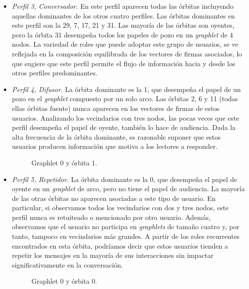 \begin{itemize}
\item \emph{Perfil 3, Conversador.} En este perfil aparecen todas las órbitas incluyendo aquellas dominantes de los otros cuatro perfiles. Las órbitas dominantes en este perfil son la 29, 7, 17, 21 y 31. Las mayoría de las órbitas son oyentes, pero la órbita 31 desempeña todos los papeles de pozo en un \textit{graphlet} de 4 nodos. La variedad de roles que puede adoptar este grupo de usuarios, se ve reflejada en la composición equilibrada de los vectores de firmas asociados, lo que sugiere que este perfil permite el flujo de información hacia y desde los otros perfiles predominantes.

\item \emph{Perfil 4, Difusor.} La órbita dominante es la 1, que desempeña el papel de un pozo en el \textit{graphlet} compuesto por un solo arco. Las órbitas 2, 6 y 11 (todas ellas órbitas fuente) nunca aparecen en los vectores de firmas de estos usuarios. Analizando los vecindarios con tres nodos, las pocas veces que este perfil desempeña el papel de oyente, también lo hace de audiencia. Dada la alta frecuencia de la órbita dominante, es razonable suponer que estos usuarios producen información que motiva a los lectores a responder. 
\begin{figure}[htbp]
   \centering
   
    \caption{Graphlet 0 y órbita 1.}
    \label{fig:0-1}
\end{figure}

\item \emph{Perfil 5, Repetidor.} La órbita dominante es la 0, que desempeña el papel de oyente en un \textit{graphlet} de arco, pero no tiene el papel de audiencia. La mayoría de las otras órbitas no aparecen asociadas a este tipo de usuario. En particular, si observamos todos los vecindarios con dos y tres nodos, este perfil nunca es retuiteado o mencionado por otro usuario. Además, observamos que el usuario no participa en \textit{graphlets} de tamaño cuatro y, por tanto, tampoco en vecindarios más grandes. A partir de los roles recurrentes encontrados en esta órbita, podríamos decir que estos usuarios tienden a repetir los mensajes en la mayoría de sus interacciones sin impactar significativamente en la conversación. \begin{figure}[htbp]
   \centering
   
    \caption{Graphlet 0 y órbita 0.}
    \label{fig:0-0}
\end{figure}


\end{itemize}

